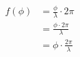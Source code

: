 \documentclass{article}
\begin{document}
  \begin{align*}
    f(\phi) &= \frac{\phi}{\lambda} \cdot 2 \pi\\
    &= \frac{\phi \cdot 2 \pi}{\lambda}\\
    &= \phi \cdot \frac{2 \pi}{\lambda}
  \end{align*}
\end{document}
